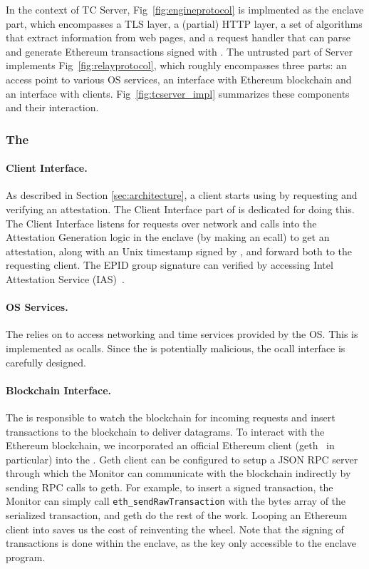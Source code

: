 In the context of TC Server, Fig~\ref{fig:engineprotocol} is implmented as the
enclave part, which encompasses a TLS layer, a (partial) HTTP layer, a set of
algorithms that extract information from web pages, and a request handler that
can parse and generate Ethereum transactions signed with \skTC. The untrusted
part of \tc Server implements Fig~\ref{fig:relayprotocol}, which roughly
encompasses three parts: an access point to various OS services, an interface
with Ethereum blockchain and an interface with clients.
Fig~\ref{fig:tcserver_impl} summarizes these components and their interaction.


\subsubsection{The \medname}

\paragraph{Client Interface.} As described in Section \ref{sec:architecture},
a client starts using \tc by requesting and verifying an attestation.  The
Client Interface part of \medname is dedicated for doing this.  The Client Interface 
listens for requests over network and calls into the Attestation Generation logic in the
enclave (by making an ecall) to get an attestation, along with an Unix timestamp
signed by \pkTC, and forward both to the requesting client. The EPID group
signature can verified by accessing Intel Attestation Service (IAS)~\cite{}. 

\paragraph{OS Services.} The \encname relies on \medname to access networking and 
time services provided by the OS. This is implemented as ocalls.
Since the \encname is potentially malicious, the ocall interface is carefully
designed.

\paragraph{Blockchain Interface.} The \medname is responsible to watch the
blockchain for incoming requests and insert transactions to the blockchain to
deliver datagrams. To interact with the Ethereum blockchain, we incorporated an
official Ethereum client (geth~\cite{geth} in particular) into the \medname.
Geth client can be configured to setup a JSON RPC server through which the
Monitor can communicate with the blockchain indirectly by sending RPC calls to
geth. For example, to insert a signed transaction, the Monitor can simply call
\texttt{eth\_sendRawTransaction} with the bytes array of the serialized
transaction, and geth do the rest of the work. Looping an Ethereum
client into \medname saves us the cost of reinventing the wheel. 
Note that the signing of transactions is done within the enclave, as the key
\pkTC only accessible to the enclave program.


